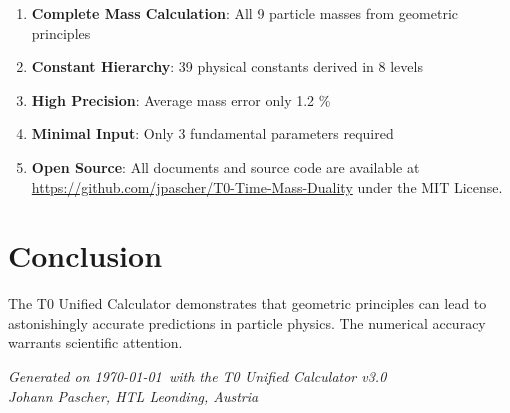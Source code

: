 \documentclass[11pt,a4paper]{article}
\begin{document}
\begin{enumerate}
\item \textbf{Complete Mass Calculation}: All 9 particle masses from geometric principles
\item \textbf{Constant Hierarchy}: 39 physical constants derived in 8 levels
\item \textbf{High Precision}: Average mass error only 1.2 \%
\item \textbf{Minimal Input}: Only 3 fundamental parameters required
\item \textbf{Open Source}: All documents and source code are available at \url{https://github.com/jpascher/T0-Time-Mass-Duality} under the MIT License.
\end{enumerate}

\section{Conclusion}

The T0 Unified Calculator demonstrates that geometric principles can lead to astonishingly accurate predictions in particle physics. The numerical accuracy warrants scientific attention.

\vfill
\begin{center}
\textit{Generated on \today\ with the T0 Unified Calculator v3.0}\\
\textit{Johann Pascher, HTL Leonding, Austria}
\end{center}
\end{document}
